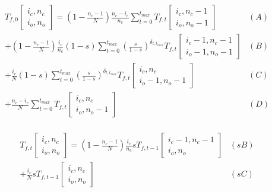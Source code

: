 \documentclass[preview]{standalone}
\newcommand{\Coalc}[4]{\begin{bmatrix}#1,#2 \\ #3,#4 \end{bmatrix}}
\begin{document}
\begin{equation*}
  \begin{aligned}
    T_{f,0}\Coalc{i_c}{n_c}{i_o}{n_o}
    = \left(1-\frac{n_c-1}{N}\right) \frac{n_c-i_c}{n_c}       \sum_{t=0}^{t_{max}}                                                 T_{f,t}\Coalc{i_c  }{n_c-1}{i_o  }{n_o-1} & (A) \\
    + \left(1-\frac{n_c-1}{N}\right) \frac{i_c}{n_c}     (1-s) \sum_{t=0}^{t_{max}} \left(\frac{s}{1-s}\right)^{\delta_{t,t_{max}}} T_{f,t}\Coalc{i_c-1}{n_c-1}{i_o-1}{n_o-1} & (B) \\
    +                                \frac{i_c}{N}       (1-s) \sum_{t=0}^{t_{max}} \left(\frac{s}{1-s}\right)^{\delta_{t,t_{max}}} T_{f,t}\Coalc{i_c  }{n_c  }{i_o-1}{n_o-1} & (C) \\
    +                                \frac{n_c-i_c}{N}         \sum_{t=0}^{t_{max}}                                                 T_{f,t}\Coalc{i_c  }{n_c  }{i_o  }{n_o-1} & (D) \\
  \end{aligned}
\end{equation*}

\begin{equation*}
  \begin{aligned}
    T_{f,t}\Coalc{i_c}{n_c}{i_o}{n_o}
    = \left(1-\frac{n_c-1}{N}\right) \frac{i_c}{n_c} s T_{f,t-1} \Coalc{i_c-1}{n_c-1}{i_o}{n_o}& (sB) \\
    +                                \frac{i_c}{N}   s T_{f,t-1} \Coalc{i_c  }{n_c  }{i_o}{n_o}& (sC) \\
  \end{aligned}
\end{equation*}
\end{document}
